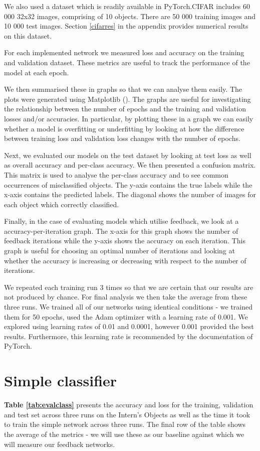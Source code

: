 \documentclass{l4proj}
\begin{document}
We also used a dataset which is readily available in PyTorch.CIFAR includes 60 000 32x32 images, comprising of  10 objects. There are 50 000 training images and 10 000 test images. Section \ref{cifarres} in the appendix provides numerical results on this dataset.

For each implemented network we measured loss and accuracy on the training and validation dataset. These metrics are useful to track the performance of the model at each epoch.

We then summarised these in graphs so that we can analyse them easily. The plots were generated using Matplotlib (\cite{matplotlib}). The graphs are useful for investigating the relationship between the number of epochs and the training and validation losses and/or accuracies. In particular, by plotting these in a graph we can easily whether a model is overfitting or underfitting by looking at how the difference between training loss and validation loss changes with the number of epochs.

Next, we evaluated our models on the test dataset by looking at test loss as well as overall accuracy and per-class accuracy. We then presented a confusion matrix. This matrix is used to analyse the per-class accuracy and to see common occurrences of misclassified objects. The y-axis contains the true labels while the x-axis contains the predicted labels. The diagonal shows the number of images for each object which correctly classified. 

Finally, in the case of evaluating models which utilise feedback, we look at a accuracy-per-iteration graph. The x-axis for this graph shows the number of feedback iterations while the y-axis shows the accuracy on each iteration. This graph is useful for choosing an optimal number of iterations and looking at whether the accuracy is increasing or decreasing with respect to the number of iterations.

We repeated each training run 3 times so that we are certain that our results are not produced by chance. For final analysis we then take the average from these three runs. We trained all of our networks using identical conditions - we trained them for 50 epochs, used the Adam optimizer with a learning rate of 0.001. We explored using learning rates of 0.01 and 0.0001, however 0.001 provided the best results. Furthermore, this learning rate is recommended by the documentation of PyTorch.

\section{Simple classifier}
\textbf{Table \ref{tab:evalclass}} presents the accuracy and loss for the training, validation and test set across three runs on the Intern's Objects as well as the time it took to train the simple network across three runs. The final row of the table shows the average of the metrics - we will use these as our baseline against which we will measure our feedback networks.
\end{document}
